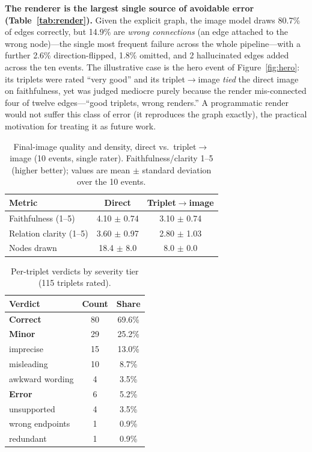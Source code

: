 \documentclass[sigconf,natbib=false, language=english]{acmart}
\begin{document}
\textbf{The renderer is the largest single source of avoidable error (Table~\ref{tab:render}).} Given the explicit graph, the image model draws 80.7\% of edges correctly, but 14.9\% are \emph{wrong connections} (an edge attached to the wrong node)---the single most frequent failure across the whole pipeline---with a further 2.6\% direction-flipped, 1.8\% omitted, and 2 hallucinated edges added across the ten events. The illustrative case is the hero event of Figure~\ref{fig:hero}: its triplets were rated ``very good'' and its triplet$\rightarrow$image \emph{tied} the direct image on faithfulness, yet was judged mediocre purely because the render mis-connected four of twelve edges---``good triplets, wrong renders.'' A programmatic render would not suffer this class of error (it reproduces the graph exactly), the practical motivation for treating it as future work.

\begin{table}[t]\centering
\caption{Final-image quality and density, direct vs.\ triplet$\rightarrow$image (10 events, single rater). Faithfulness/clarity 1--5 (higher better); values are mean $\pm$ standard deviation over the 10 events.}
\label{tab:image}
\begin{tabular}{lcc}
\toprule
Metric & Direct & Triplet$\rightarrow$image \\
\midrule
Faithfulness (1--5) & 4.10 $\pm$ 0.74 & 3.10 $\pm$ 0.74 \\
Relation clarity (1--5) & 3.60 $\pm$ 0.97 & 2.80 $\pm$ 1.03 \\
Nodes drawn & 18.4 $\pm$ 8.0 & 8.0 $\pm$ 0.0 \\
\bottomrule
\end{tabular}
\end{table}

\begin{table}[t]\centering
\caption{Per-triplet verdicts by severity tier (115 triplets rated).}
\label{tab:codebook}
\begin{tabular}{lcc}
\toprule
Verdict & Count & Share \\
\midrule
\textbf{Correct} & 80 & 69.6\% \\
\midrule
\textbf{Minor} & 29 & 25.2\% \\
\quad imprecise & 15 & 13.0\% \\
\quad misleading & 10 & 8.7\% \\
\quad awkward wording & 4 & 3.5\% \\
\midrule
\textbf{Error} & 6 & 5.2\% \\
\quad unsupported & 4 & 3.5\% \\
\quad wrong endpoints & 1 & 0.9\% \\
\quad redundant & 1 & 0.9\% \\
\bottomrule
\end{tabular}
\end{table}
\end{document}
